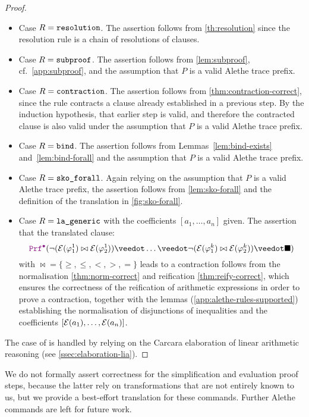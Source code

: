 \begin{proof}
\begin{itemize}
  \item Case $R = \texttt{\upshape{resolution}}$. The assertion follows from \cref{th:resolution} since the resolution rule is a chain of resolutions of clauses.
  \item Case $R = \texttt{\upshape{subproof}}$. The assertion follows from \cref{lem:subproof}, cf.\ \cref{app:subproof}, and the assumption that $P$ is a valid Alethe trace prefix.
  \item Case $R = \texttt{\upshape{contraction}}$.
    The assertion follows from \cref{thm:contraction-correct}, since the rule contracts a clause already established in a previous step. 
    By the induction hypothesis, that earlier step is valid, and therefore the contracted clause is also valid under the assumption that $P$ is a valid Alethe trace prefix.
  \item Case $R = \texttt{\upshape{bind}}$. The assertion follows from Lemmas~\ref{lem:bind-exists} and~\ref{lem:bind-forall} and the assumption that $P$ is a valid Alethe trace prefix.
  \item Case $R = \texttt{\upshape{sko\_forall}}$. Again relying on the assumption that $P$ is a valid Alethe trace prefix, the assertion follows from \cref{lem:sko-forall} and the definition of the translation in \cref{fig:sko-forall}.
  \item Case $R = \texttt{\upshape{la\_generic}}$ with the coefficients $[a_1 ,\dots, a_n]$ given. The assertion that the translated clause:
    \[
        \prfcl (\neg(\E{\varphi^1_1} \bowtie \E{\varphi^1_2}) \veedot \dots \veedot  \neg(\E{\varphi^k_1} \bowtie \E{\varphi^k_2}) \veedot \nil)
    \]
    with $\bowtie = \{ \geq, \leq, <, >, = \}$ leads to a contraction follows from the normalisation \cref{thm:norm-correct} and reification \cref{thm:reify-correct}, which ensures the correctness of the reification of arithmetic expressions in order to prove a contraction,
    together with the lemmas (\cref{app:alethe-rules-supported}) establishing the normalisation of disjunctions of inequalities and the coefficients $[\mathcal{E}(a_1) ,\dots, \mathcal{E}(a_n)]$. 
  \end{itemize}
    The case of  is handled by relying on the Carcara elaboration of linear arithmetic reasoning (see \cref{ssec:elaboration-lia}). 

\end{proof}

We do not formally assert correctness for the simplification and evaluation proof steps, because the latter rely on transformations that are not entirely known to us, but we provide a best-effort translation for these commands. Further Alethe commands are left for future work.
